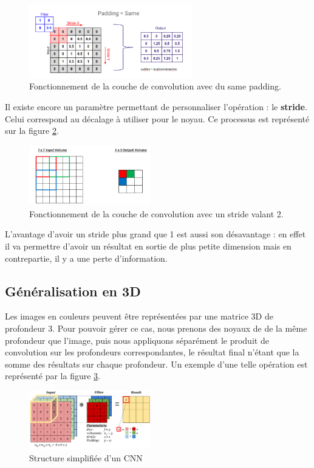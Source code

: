 \begin{figure}[!h]
\centering
\includegraphics[width=200pt]{images/cnn/same_padding.png}
\caption{Fonctionnement de la couche de convolution avec du same padding.}
\label{same_padding}
\end{figure}

Il existe encore un paramètre permettant de personnaliser l'opération : le \textbf{stride}. Celui correspond au décalage à utiliser pour le noyau. Ce processus est représenté sur la figure \ref{stride}.

\begin{figure}[!h]
\centering
\includegraphics[width=150pt]{images/cnn/stride.png}
\caption{Fonctionnement de la couche de convolution avec un stride valant 2.}
\label{stride}
\end{figure}
 
L'avantage d'avoir un stride plus grand que 1 est aussi son désavantage : en effet il va permettre d'avoir un résultat en sortie de plus petite dimension mais en contrepartie, il y a une perte d'information.

\subsection{Généralisation en 3D}

Les images en couleurs peuvent être représentées par une matrice 3D de profondeur 3. Pour pouvoir gérer ce cas, nous prenons des noyaux de de la même profondeur que l'image, puis nous appliquons séparément le produit de convolution sur les profondeurs correspondantes, le résultat final n'étant que la somme des résultats sur chaque profondeur. Un exemple d'une telle opération est représenté par la figure \ref{CNN_3D}.

\begin{figure}[!h]
\centering
\includegraphics[width=150pt]{images/cnn/CNN_3D.png}
\caption{Structure simplifiée d'un CNN}
\label{CNN_3D}
\end{figure}

